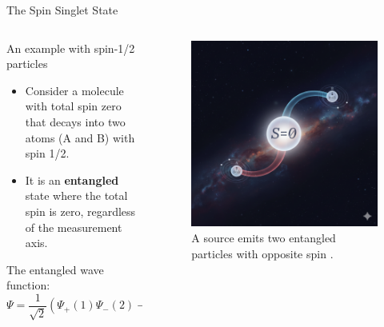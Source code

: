 \begin{frame}{The Spin Singlet State}
  \begin{columns}[T]
    \begin{column}{0.5\textwidth}
      \begin{block}{An example with spin-1/2 particles}
        \begin{itemize}[<+->]
          \item Consider a molecule with total spin zero that decays into two atoms (A and B) with spin 1/2.
          \item It is an \textbf{entangled} state where the total spin is zero, regardless of the measurement axis.
        \end{itemize}
      \end{block}
      \vspace{0.5em}
      The entangled wave function:
      $$ {\Psi} = \frac{1}{\sqrt{2}} \left( \Psi_{+}{(1)} \Psi_{-}{(2)} - \Psi_{-}{(1)} \Psi_{+}{(2)} \right) $$
    \end{column}

    \begin{column}{0.5\textwidth}
      \begin{figure}
        \centering
        \includegraphics[height=0.7\textheight, keepaspectratio]{images/spin.png}
        \caption{A source emits two entangled particles with opposite spin \cite{Google2025_Entangled}.}
      \end{figure}
    \end{column}
  \end{columns}
\end{frame}

